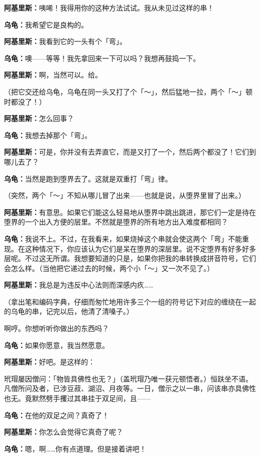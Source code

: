 \documentclass[
  12pt,
  twoside,
  openright,
  oldfontcommands,
]{memoir}
\newcommand{\kaitismall}[1]{{\kaitifamily\small #1}}
\newcommand{\dialogname}[1]{{\heifamily\bfseries #1}}
\begin{document}
\dialogname{阿基里斯：}咦唏！我得用你的这种方法试试。我从未见过这样的串！

\dialogname{乌龟：}我希望它是良构的。

\dialogname{阿基里斯：}我看到它的一头有个「弯」。

\dialogname{乌龟：}噢------等等！我先拿回来一下可以吗？我想再鼓捣一下。

\dialogname{阿基里斯：}啊，当然可以。给。

（把它交还给乌龟，乌龟在同一头又打了个「～」，然后猛地一拉，两个「～」顿时都没了！）

\dialogname{阿基里斯：}怎么回事？

\dialogname{乌龟：}我想去掉那个「弯」。

\dialogname{阿基里斯：}可是，你并没有去弄直它，而是又打了一个，然后两个都没了！它们到哪儿去了？

\dialogname{乌龟：}当然是跑到堕界去了。这就是双重打「弯」律。

（突然，两个「～」不知从哪儿冒了出来------也就是说，从堕界里冒了出来。）

\dialogname{阿基里斯：}有意思。如果它们能这么轻易地从堕界中跳出跳进，那它们一定是待在堕界的一个出入方便的层里。不然就是堕界的所有地方出入难度都相同？

\dialogname{乌龟：}我说不上。不过，在我看来，如果烧掉这个串就会使这两个「弯」不能重现。在这种情况下，你应该认为它们是呆在堕界的深层里。说不定堕界有好多好多层呢。不过这无所谓。我想要知道的只是，如果你把我的串转换成拼音符号，它们会怎么样。\kaitismall{（当他把它递过去的时候，两个小「～」又一次不见了。）}

\dialogname{阿基里斯：}我总是为违反中心法则而深感内疚\ldots\ldots{}

（拿出笔和编码字典，仔细而匆忙地用许多三个一组的符号记下对应的缠绕在一起的乌龟的串，记完以后，他清了清嗓子。）

啊哼。你想听听你做出的东西吗？

\dialogname{乌龟：}如果你愿意，我当然愿意。

\dialogname{阿基里斯：}好吧。是这样的：

玳瑁屡因僧问：「物皆具佛性也无？」{（盖玳瑁乃唯一获元顿悟者。）}恒趺坐不语。凡僧所问及者，已涉豆菽、湖沼、月夜等。一日，僧示之以一串，问该串亦具佛性也无。竟默然劈手攫过其串挂于双足间，且------

\dialogname{乌龟：}在他的双足之间？真奇了！

\dialogname{阿基里斯：}你怎么会觉得它真奇了呢？

\dialogname{乌龟：}嗯，啊\ldots\ldots 你有点道理。但是接着讲吧！
\end{document}
